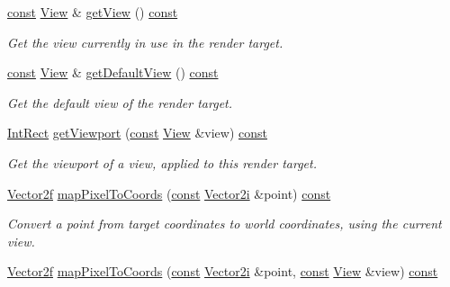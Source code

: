\begin{DoxyCompactItemize}
\hyperlink{term__entry_8h_a57bd63ce7f9a353488880e3de6692d5a}{const} \hyperlink{classsf_1_1_view}{View} \& \hyperlink{classsf_1_1_render_target_a98f721cc6dc11478922427fedfb2288b}{get\-View} () \hyperlink{term__entry_8h_a57bd63ce7f9a353488880e3de6692d5a}{const} 
\begin{DoxyCompactList}\small\item\em Get the view currently in use in the render target. \end{DoxyCompactList}\item 
\hyperlink{term__entry_8h_a57bd63ce7f9a353488880e3de6692d5a}{const} \hyperlink{classsf_1_1_view}{View} \& \hyperlink{classsf_1_1_render_target_a718b1aa6296bf855171699cc18251ced}{get\-Default\-View} () \hyperlink{term__entry_8h_a57bd63ce7f9a353488880e3de6692d5a}{const} 
\begin{DoxyCompactList}\small\item\em Get the default view of the render target. \end{DoxyCompactList}\item 
\hyperlink{namespacesf_a1b1279ab06950b96686cffaacb72fed5}{Int\-Rect} \hyperlink{classsf_1_1_render_target_aae035b0d45f87a0da2a28a0de6ba1086}{get\-Viewport} (\hyperlink{term__entry_8h_a57bd63ce7f9a353488880e3de6692d5a}{const} \hyperlink{classsf_1_1_view}{View} \&view) \hyperlink{term__entry_8h_a57bd63ce7f9a353488880e3de6692d5a}{const} 
\begin{DoxyCompactList}\small\item\em Get the viewport of a view, applied to this render target. \end{DoxyCompactList}\item 
\hyperlink{namespacesf_a80cea3c46537294fd1d8d428566ad8b2}{Vector2f} \hyperlink{classsf_1_1_render_target_a2b0cab0e4c6af29d4efaba149d28116d}{map\-Pixel\-To\-Coords} (\hyperlink{term__entry_8h_a57bd63ce7f9a353488880e3de6692d5a}{const} \hyperlink{namespacesf_a0eed58bf66694ebbc55f72ca7de840d9}{Vector2i} \&point) \hyperlink{term__entry_8h_a57bd63ce7f9a353488880e3de6692d5a}{const} 
\begin{DoxyCompactList}\small\item\em Convert a point from target coordinates to world coordinates, using the current view. \end{DoxyCompactList}\item 
\hyperlink{namespacesf_a80cea3c46537294fd1d8d428566ad8b2}{Vector2f} \hyperlink{classsf_1_1_render_target_a46eb08f775dd1420d6207ea87dde6e54}{map\-Pixel\-To\-Coords} (\hyperlink{term__entry_8h_a57bd63ce7f9a353488880e3de6692d5a}{const} \hyperlink{namespacesf_a0eed58bf66694ebbc55f72ca7de840d9}{Vector2i} \&point, \hyperlink{term__entry_8h_a57bd63ce7f9a353488880e3de6692d5a}{const} \hyperlink{classsf_1_1_view}{View} \&view) \hyperlink{term__entry_8h_a57bd63ce7f9a353488880e3de6692d5a}{const} 

\end{DoxyCompactItemize}
